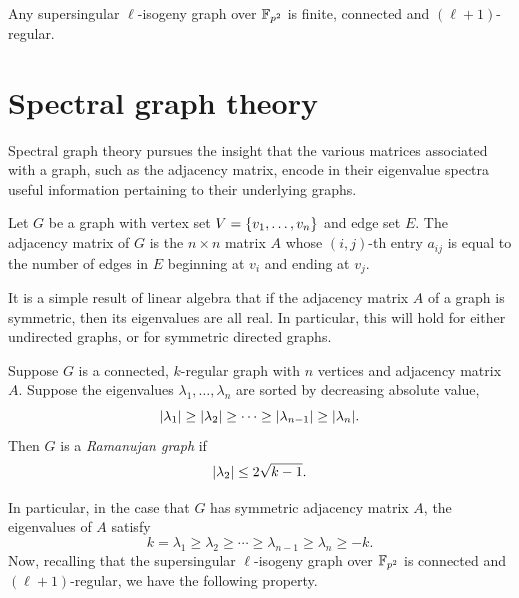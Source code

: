         \begin{property}
            Any supersingular $\ell$-isogeny graph over $\mathbb{F}_{p^2}$ is finite, connected and $(\ell+1)$-regular.
        \end{property}

    \section{Spectral graph theory}
        Spectral graph theory pursues the insight that the various matrices associated with a graph, such as the adjacency matrix, encode in their eigenvalue spectra useful information pertaining to their underlying graphs.    

        \begin{definition}
            Let $G$ be a graph with vertex set $V = \left\{v_1, \dots, v_n\right\}$ and edge set $E$. The adjacency matrix of $G$ is the $n \times n$ matrix $A$ whose $(i,j)$-th entry $a_{ij}$ is equal to the number of edges in $E$ beginning at $v_i$ and ending at $v_j$.
        \end{definition}

        It is a simple result of linear algebra that if the adjacency matrix $A$ of a graph is symmetric, then its eigenvalues are all real. In particular, this will hold for either undirected graphs, or for symmetric directed graphs. 

        \begin{definition}
            Suppose $G$ is a connected, $k$-regular graph with $n$ vertices and adjacency matrix $A$. Suppose the eigenvalues $\lambda_1, \dots, \lambda_n$ are sorted by decreasing absolute value,
            \begin{equation*}
                \abs{\lambda_1} \geq \abs{\lambda_2} \geq \cdots \geq \abs{\lambda_{n-1}} \geq \abs{\lambda_n}.
            \end{equation*}
            Then $G$ is a \textit{Ramanujan graph} if 
            \begin{equation*}
                \left\lvert\lambda_2\right\rvert \leq 2\sqrt{k-1}.
            \end{equation*}
        \end{definition}

        In particular, in the case that $G$ has symmetric adjacency matrix $A$, the eigenvalues of $A$ satisfy
        \begin{equation*}
            k = \lambda_1 \geq \lambda_2 \geq \cdots \geq \lambda_{n-1} \geq \lambda_n \geq -k.
        \end{equation*}
        Now, recalling that the supersingular $\ell$-isogeny graph over $\mathbb{F}_{p^2}$ is connected and $(\ell+1)$-regular, we have the following property.

